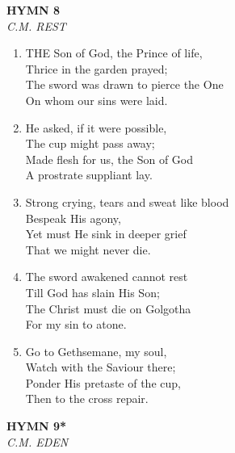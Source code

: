 \newpage
\begin{center}
    {\Large \textbf{HYMN 8}}
    \\
    \textit{C.M. REST}
\end{center}
\vspace{1em}

\begin{enumerate}
    \item THE Son of God, the Prince of life, \\
        Thrice in the garden prayed; \\
        The sword was drawn to pierce the One \\
        On whom our sins were laid.

    \item He asked, if it were possible, \\
        The cup might pass away; \\
        Made flesh for us, the Son of God \\
        A prostrate suppliant lay.

    \item Strong crying, tears and sweat like blood \\
        Bespeak His agony, \\
        Yet must He sink in deeper grief \\
        That we might never die.

    \item The sword awakened cannot rest \\
        Till God has slain His Son; \\
        The Christ must die on Golgotha \\
        For my sin to atone.

    \item Go to Gethsemane, my soul, \\
        Watch with the Saviour there; \\
        Ponder His pretaste of the cup, \\
        Then to the cross repair.

\end{enumerate}

\newpage
\begin{center}
    {\Large \textbf{HYMN 9*}}
    \\
    \textit{C.M. EDEN}
\end{center}
\vspace{1em}

